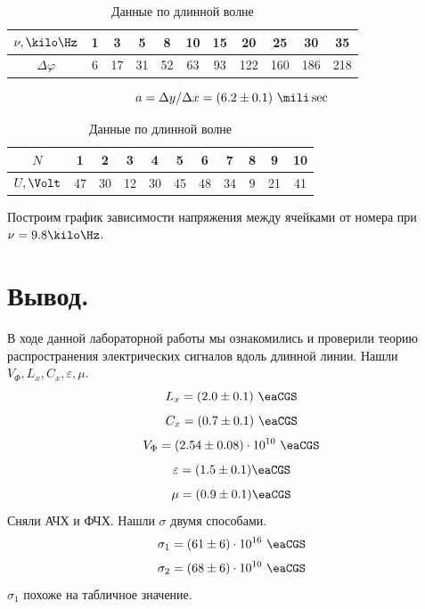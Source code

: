 \documentclass{report}
\begin{document}
\begin{table}[H]
	\centering
	\begin{tabular}{|c|c|c|c|c|c|c|c|c|c|c|} \hline
		$\nu, \kilo\Hz$  & 1 & 3  & 5  & 8  & 10 & 15 & 20  & 25  & 30  & 35  \\
		\hline
		$\Delta \varphi$ & 6 & 17 & 31 & 52 & 63 & 93 & 122 & 160 & 186 & 218 \\
		\hline
	\end{tabular}
	\caption{Данные  по длинной волне}
\end{table}

\begin{figure}[H]
	\centering
	
\end{figure}
$$
	a = \Delta y / \Delta x = (6.2 \pm 0.1) \ \mili\sec
$$
%

\begin{table}[H]
	\centering
	\begin{tabular}{|c|c|c|c|c|c|c|c|c|c|c|} \hline
		$N$              & 1 & 2  & 3  & 4  & 5  & 6  & 7   & 8   & 9   & 10  \\
		\hline
		$U, \Volt$ & 47 & 30 & 12 & 30 & 45 & 48 & 34 & 9 & 21 & 41 \\
		\hline
	\end{tabular}
	\caption{Данные  по длинной волне}
\end{table}

Построим график зависимости напряжения между ячейками
от номера при $\nu = 9.8 \kilo\Hz$.
\begin{figure}[H]
	\centering
	
\end{figure}

\section{Вывод.}
В ходе данной лабораторной работы мы ознакомились и проверили теорию распространения
электрических сигналов вдоль длинной линии.
Нашли $V_\Phi, L_x, C_x, \varepsilon, \mu$.
$$
	L_x = (2.0 \pm 0.1)\ \eaCGS
$$
$$
	C_x = (0.7 \pm 0.1)\ \eaCGS
$$
$$
	V_\Phi = (2.54 \pm 0.08) \cdot 10^{10}\ \eaCGS
$$
$$
	\varepsilon = (1.5 \pm 0.1) \eaCGS
$$
$$
	\mu = (0.9 \pm 0.1) \eaCGS
$$
Сняли АЧХ и ФЧХ.
Нашли $\sigma$ двумя способами.
$$
	\sigma_1 = (61 \pm 6) \cdot 10^{16}\ \eaCGS
$$
$$
	\sigma_2 = (68 \pm 6) \cdot 10^{10}\ \eaCGS
$$
$\sigma_1$ похоже на табличное значение.
\end{document}
